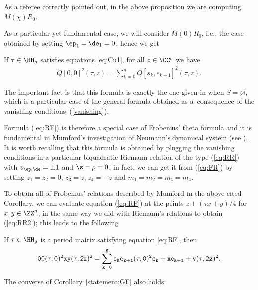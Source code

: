 \begin{Remark} As a referee correctly pointed out, in the above proposition we are computing $M(\chi)R_0$. \end{Remark}

As a particular yet fundamental case, we will consider $M(0)R_0$, i.e., the case obtained by setting $\ep_1=\de_1=0$; hence we get

\begin{Corollary}\label{statement:GF} If $\tau\in \HH_g$ satisfies equations \eqref{eq:Cu1}, for all $z\in \CC^g$ we have
\begin{gather}\label{eq:RF}
 Q[0, 0]^2(\tau, z)=\sum_{k=0}^g Q[s_k, e_{k+1}]^2(\tau, z).
\end{gather}
\end{Corollary}

\begin{Remark} The important fact is that this formula is exactly the one given in \cite[Corollary~7.5, p.~113]{mu} when $S=\varnothing$, which is a particular case of the general formula obtained as a~consequence of the vanishing conditions~(\ref{vanishing}).
 \end{Remark}

Formula (\ref{eq:RF}) is therefore a special case of Frobenius' theta formula and it is fundamental in Mumford's investigation of Neumann's dynamical system (see \cite[Lemma~9.7]{mu}). It is worth recalling that this formula is obtained by plugging the vanishing conditions in a particular biquadratic Riemann relation of the type (\ref{eq:RR}) with $v_{\ep,\de}=\pm 1$ and $\s=\rho=0$; in fact, we can get it from (\ref{eq:FR}) by setting $z_1=z_2=0$, $z_3=z$, $z_4=-z$ and $ m_1=m_2=m_3=m_4.$

To obtain all of Frobenius' relations described by Mumford in the above cited Corollary, we can evaluate equation (\ref{eq:RF}) at the points $z+(\tau x+y)/4$ for $x,y \in\ZZ^g$, in the same way we did with Riemann's relations to obtain (\ref{eq:RR2}); this leads to the following
\begin{Corollary} If $\tau\in \HH_g$ is a period matrix
satisfying equation \eqref{eq:RF}, then
\begin{gather}\label{eq:RF2}
 \tt{0}{0}(\tau,0)^2\tt{x}{y }(\tau, 2z)^2 =\sum_{k=0}^g \tt{s_k}{e_{k+1}}(\tau,0)^2\tt{s_k+x}{e_{k+1}+y }(\tau, 2z)^2 .
\end{gather}
\end{Corollary}

The converse of Corollary~\ref{statement:GF} also holds:

